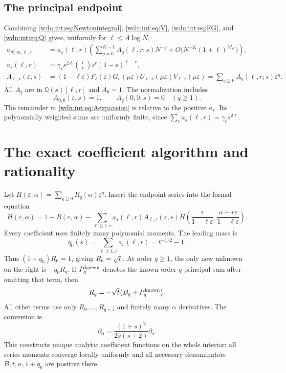 \documentclass[11pt,letterpaper]{article}
\theoremstyle{remark}\newtheorem{remark}[theorem]{Remark}
\newcommand{\Q}{\mathbb Q}
\newcommand{\eps}{\varepsilon}
\begin{document}
\subsection{The principal endpoint}
Combining \eqref{wdn:int:eq:Newtonintegral}, \eqref{wdn:int:eq:V}, \eqref{wdn:int:eq:FG}, and
\eqref{wdn:int:eq:Q} gives, uniformly for $\ell\le A\log N$,
\begin{align}
 a_{N,m,\ell,r}
 &=a_s(\ell,r)\left(\sum_{q=0}^{K-1}A_q(\ell,r;s)N^{-q}
       +O\bigl(N^{-K}(1+\ell)^{M_K}\bigr)\right),\label{wdn:int:eq:Aexpansion}\\
 a_s(\ell,r)&=\gamma_\ell s^{2\ell}\binom\ell r s^r(1-s)^{\ell-r},
 \label{wdn:int:eq:leadingkernel}\\
 A_{\ell,r}(\eps,s)&=(1-\ell\eps)F_\ell(\eps)
 G_r(\mu\eps)U_{\ell,r}(\mu\eps)V_{\ell,r}(\mu\eps)
     =\sum_{q\ge0}A_q(\ell,r;s)\eps^q.\label{wdn:int:eq:Aseries}
\end{align}
All $A_q$ are in $\Q(s)[\ell,r]$ and $A_0=1$. The normalization includes
\begin{equation}\label{wdn:int:eq:zerocancellation}
 A_{0,0}(\eps,s)=1,\qquad A_q(0,0;s)=0\quad(q\ge1).
\end{equation}
The remainder in \eqref{wdn:int:eq:Aexpansion} is relative to the positive
$a_s$. Its polynomially weighted sums are uniformly finite, since
$\sum_r a_s(\ell,r)=\gamma_\ell s^{2\ell}$.

\section{The exact coefficient algorithm and rationality}\label{wdn:int:sec:algorithm}
Let $H(\eps,\alpha)=\sum_{q\ge0}R_q(\alpha)\eps^q$.
Insert the endpoint series into the formal equation
\begin{equation}\label{wdn:int:eq:formalH}
 H(\eps,\alpha)=1-B(\eps,\alpha)
 -\sum_{\ell\ge1,r}a_s(\ell,r)A_{\ell,r}(\eps,s)
 H\left(\frac\eps{1-\ell\eps},
          \frac{\alpha-r\eps}{1-\ell\eps}\right).
\end{equation}
Every coefficient uses finitely many polynomial moments. The leading mass
is
\begin{equation}\label{wdn:int:eq:mass}
 q_0(s)=\sum_{\ell\ge1,r}a_s(\ell,r)=t^{-1/2}-1.
\end{equation}
Thus $(1+q_0)R_0=1$, giving $R_0=\sqrt t$. At order $q\ge1$, the only
new unknown on the right is $-q_0R_q$. If $P_q^{\rm known}$ denotes
the known order-$q$ principal sum after omitting that term, then
\begin{equation}\label{wdn:int:eq:Rrec}
 R_q=-\sqrt t\bigl(B_q+P_q^{\rm known}\bigr).
\end{equation}
All other terms use only $R_0,\ldots,R_{q-1}$ and finitely many
$\alpha$ derivatives. The conversion is
\begin{equation}\label{wdn:int:eq:alphaderivative}
 \partial_\alpha=\frac{(1+s)^2}{2s(s+2)}\partial_s.
\end{equation}
This constructs unique analytic coefficient functions on the whole
interior: all series moments converge locally uniformly and all
necessary denominators $B,t,\alpha,1+q_0$ are positive there.
\end{document}
